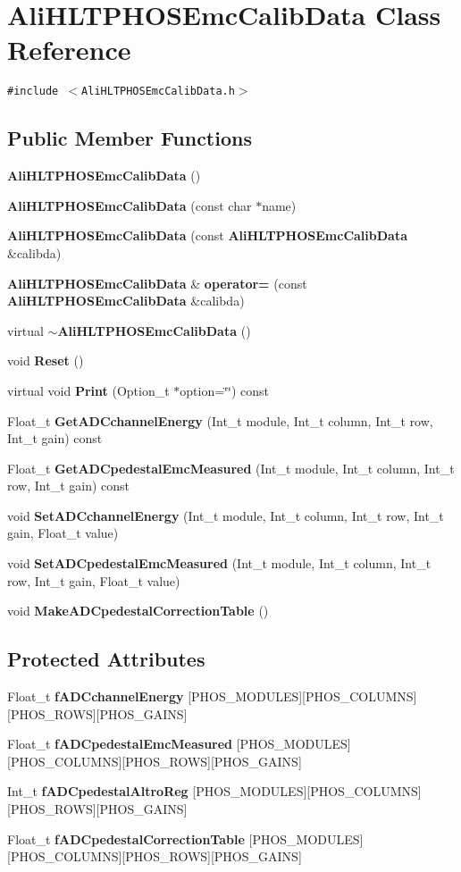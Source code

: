 \section{Ali\-HLTPHOSEmc\-Calib\-Data Class Reference}
\label{classAliHLTPHOSEmcCalibData}
{\tt \#include $<$Ali\-HLTPHOSEmc\-Calib\-Data.h$>$}

\subsection*{Public Member Functions}
\begin{CompactItemize}
\item 
{\bf Ali\-HLTPHOSEmc\-Calib\-Data} ()
\item 
{\bf Ali\-HLTPHOSEmc\-Calib\-Data} (const char $\ast$name)
\item 
{\bf Ali\-HLTPHOSEmc\-Calib\-Data} (const {\bf Ali\-HLTPHOSEmc\-Calib\-Data} \&calibda)
\item 
{\bf Ali\-HLTPHOSEmc\-Calib\-Data} \& {\bf operator=} (const {\bf Ali\-HLTPHOSEmc\-Calib\-Data} \&calibda)
\item 
virtual {\bf $\sim$Ali\-HLTPHOSEmc\-Calib\-Data} ()
\item 
void {\bf Reset} ()
\item 
virtual void {\bf Print} (Option\_\-t $\ast$option=\char`\"{}\char`\"{}) const 
\item 
Float\_\-t {\bf Get\-ADCchannel\-Energy} (Int\_\-t module, Int\_\-t column, Int\_\-t row, Int\_\-t gain) const 
\item 
Float\_\-t {\bf Get\-ADCpedestal\-Emc\-Measured} (Int\_\-t module, Int\_\-t column, Int\_\-t row, Int\_\-t gain) const 
\item 
void {\bf Set\-ADCchannel\-Energy} (Int\_\-t module, Int\_\-t column, Int\_\-t row, Int\_\-t gain, Float\_\-t value)
\item 
void {\bf Set\-ADCpedestal\-Emc\-Measured} (Int\_\-t module, Int\_\-t column, Int\_\-t row, Int\_\-t gain, Float\_\-t value)
\item 
void {\bf Make\-ADCpedestal\-Correction\-Table} ()
\end{CompactItemize}
\subsection*{Protected Attributes}
\begin{CompactItemize}
\item 
Float\_\-t {\bf f\-ADCchannel\-Energy} [PHOS\_\-MODULES][PHOS\_\-COLUMNS][PHOS\_\-ROWS][PHOS\_\-GAINS]
\item 
Float\_\-t {\bf f\-ADCpedestal\-Emc\-Measured} [PHOS\_\-MODULES][PHOS\_\-COLUMNS][PHOS\_\-ROWS][PHOS\_\-GAINS]
\item 
Int\_\-t {\bf f\-ADCpedestal\-Altro\-Reg} [PHOS\_\-MODULES][PHOS\_\-COLUMNS][PHOS\_\-ROWS][PHOS\_\-GAINS]
\item 
Float\_\-t {\bf f\-ADCpedestal\-Correction\-Table} [PHOS\_\-MODULES][PHOS\_\-COLUMNS][PHOS\_\-ROWS][PHOS\_\-GAINS]
\end{CompactItemize}


